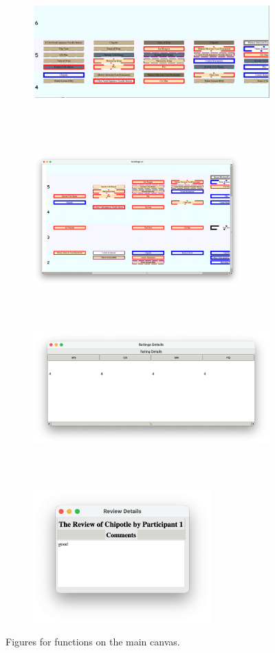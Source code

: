 \documentclass[a4paper,11pt]{memoir}
\begin{document}
\begin{figure}[h]
    \centering
    \begin{subfigure}[t]{0.5\textwidth}
        \centering
        \includegraphics[height=2in]{art/darken.png}
        \caption{\label{fig:darken}}
    \end{subfigure}%
    ~ 
    \begin{subfigure}[t]{0.5\textwidth}
        \centering
        \includegraphics[height=2in]{art/filtered.png}
        \caption{\label{fig:filtered}}
    \end{subfigure}
    ~
    \begin{subfigure}[t]{0.5\textwidth}
        \centering
        \includegraphics[height=2in]{art/sub-ratings.png}
        \caption{\label{fig:sub-ratings.png}}
    \end{subfigure}%
    ~ 
    \begin{subfigure}[t]{0.5\textwidth}
        \centering
        \includegraphics[height=2in]{art/review_details.png}
        \caption{\label{fig:review_details.png}}
    \end{subfigure}
    \caption{Figures for functions on the main canvas.}
\end{figure}
\end{document}

